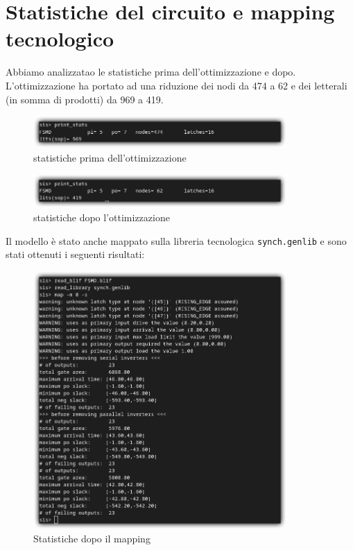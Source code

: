 \documentclass[a4paper]{report}
\begin{document}
\clearpage %


\section{Statistiche del circuito e mapping tecnologico}

Abbiamo analizzatao le statistiche prima dell'ottimizzazione e dopo.
L'ottimizzazione ha portato ad una riduzione dei nodi da 474 a 62 e dei letterali (in somma di prodotti) da 969 a 419.

  \begin{figure}[ht]
    \centering
      \includegraphics[width=0.86\textwidth]{not_opt.png}
      \caption{statistiche prima dell'ottimizzazione}
      \label{img:opt.png}
  \end{figure}

  \begin{figure}[h]
    \centering
      \includegraphics[width=0.86\textwidth]{opt.png}
      \caption{statistiche dopo l'ottimizzazione}
      \label{img:not_opt.png}
  \end{figure}


  Il modello è stato anche mappato sulla libreria tecnologica \texttt{synch.genlib} e sono stati ottenuti i seguenti risultati:
  \begin{figure}[hb]
    \centering
      \includegraphics[width=0.86\textwidth]{mapping.png}
      \caption{Statistiche dopo il mapping}
      \label{img:mapping.png}
  \end{figure}
\end{document}
